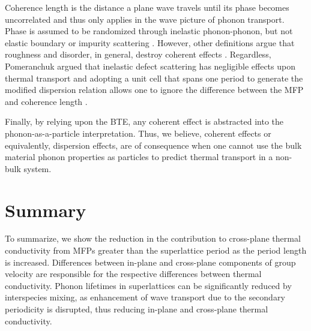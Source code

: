 \documentclass[aps,prb,preprint,preprintnumbers,amsmath,amssymb,floatfix,superscriptaddress]{revtex4}
\begin{document}
Coherence length is the distance a plane wave travels until its phase becomes uncorrelated and thus only applies in the wave picture of phonon transport. Phase is assumed to be randomized through inelastic phonon-phonon, but not elastic boundary or impurity scattering \cite{chen2005nanoscale}. However, other definitions argue that roughness and disorder, in general, destroy coherent effects \cite{PhysRevB.67.195311,dames_682}. Regardless, Pomeranchuk argued that inelastic defect scattering has negligible effects upon thermal transport \cite{pomeranchuk1942thermal} and adopting a unit cell that spans one period to generate the modified dispersion relation allows one to ignore the difference between the MFP and coherence length \cite{PhysRevB.67.195311}.

Finally, by relying upon the BTE, any coherent effect is abstracted into the phonon-as-a-particle interpretation. Thus, we believe, coherent effects or equivalently, dispersion effects, are of consequence when one cannot use the bulk material phonon properties as particles to predict thermal transport in a non-bulk system.

\section{Summary}

To summarize, we show the reduction in the contribution to cross-plane thermal conductivity from MFPs greater than the superlattice period as the period length is increased. Differences between in-plane and cross-plane components of group velocity are responsible for the respective differences between thermal conductivity. Phonon lifetimes in superlattices can be significantly reduced by interspecies mixing, as enhancement of wave transport due to the secondary periodicity is disrupted, thus reducing in-plane and cross-plane thermal conductivity.

\newpage
%

\end{document}
